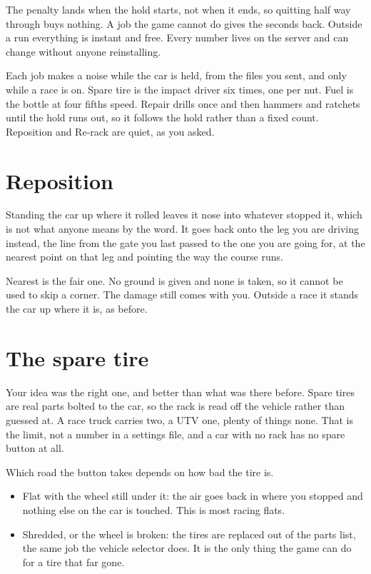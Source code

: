 \documentclass[11pt,a4paper]{article}
\begin{document}
The penalty lands when the hold starts, not when it ends, so quitting half way
through buys nothing. A job the game cannot do gives the seconds back. Outside
a run everything is instant and free. Every number lives on the server and can
change without anyone reinstalling.

Each job makes a noise while the car is held, from the files you sent, and
only while a race is on. Spare tire is the impact driver six times, one per
nut. Fuel is the bottle at four fifths speed. Repair drills once and then
hammers and ratchets until the hold runs out, so it follows the hold rather
than a fixed count. Reposition and Re-rack are quiet, as you asked.

\section{Reposition}

Standing the car up where it rolled leaves it nose into whatever stopped it,
which is not what anyone means by the word. It goes back onto the leg you are
driving instead, the line from the gate you last passed to the one you are
going for, at the nearest point on that leg and pointing the way the course
runs.

Nearest is the fair one. No ground is given and none is taken, so it cannot be
used to skip a corner. The damage still comes with you. Outside a race it
stands the car up where it is, as before.

\section{The spare tire}

Your idea was the right one, and better than what was there before. Spare
tires are real parts bolted to the car, so the rack is read off the vehicle
rather than guessed at. A race truck carries two, a UTV one, plenty of things
none. That is the limit, not a number in a settings file, and a car with no
rack has no spare button at all.

Which road the button takes depends on how bad the tire is.

\begin{itemize}
  \item Flat with the wheel still under it: the air goes back in where you
        stopped and nothing else on the car is touched. This is most racing
        flats.
  \item Shredded, or the wheel is broken: the tires are replaced out of the
        parts list, the same job the vehicle selector does. It is the only
        thing the game can do for a tire that far gone.
\end{itemize}
\end{document}

